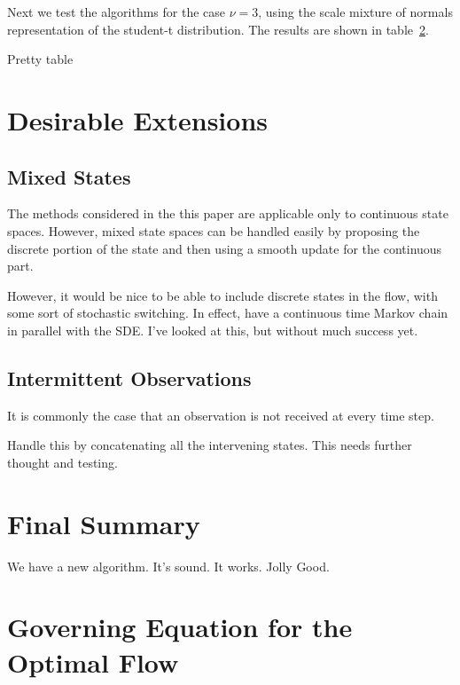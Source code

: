 \documentclass[a4paper,10pt]{article}
\newcommand{\dof}{\nu}                          %
\begin{document}
Next we test the algorithms for the case $\dof = 3$, using the scale mixture of normals representation of the student-t distribution. The results are shown in table~\ref{}.

{\meta Pretty table}


\section{Desirable Extensions}

\subsection{Mixed States}

The methods considered in the this paper are applicable only to continuous state spaces. However, mixed state spaces can be handled easily by proposing the discrete portion of the state and then using a smooth update for the continuous part.

{\meta However, it would be nice to be able to include discrete states in the flow, with some sort of stochastic switching. In effect, have a continuous time Markov chain in parallel with the SDE. I've looked at this, but without much success yet.}

\subsection{Intermittent Observations}

It is commonly the case that an observation is not received at every time step.

{\meta Handle this by concatenating all the intervening states. This needs further thought and testing.}



\section{Final Summary}

{\meta We have a new algorithm. It's sound. It works. Jolly Good.}





\appendix

\section{Governing Equation for the Optimal Flow} \label{app:optimal_flow_governing_eq}
\end{document}

